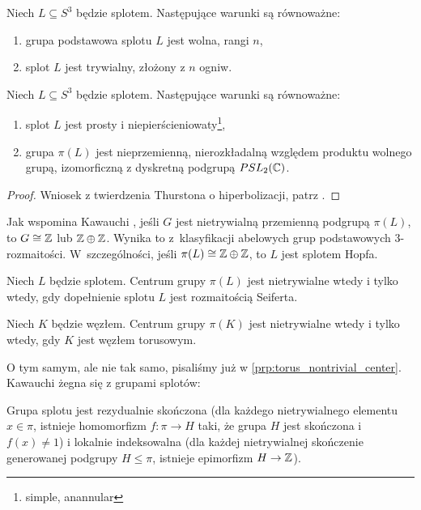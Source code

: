 \begin{corollary}
    Niech $L \subseteq S^3$ będzie splotem.
    Następujące warunki są równoważne:
    \begin{enumerate}
        \item grupa podstawowa splotu $L$ jest wolna, rangi $n$,
        \item splot $L$ jest trywialny, złożony z $n$ ogniw.
    \end{enumerate}
\end{corollary}

\begin{proposition}
    Niech $L \subseteq S^3$ będzie splotem.
    Następujące warunki są równoważne:
    \begin{enumerate}
        \item splot $L$ jest prosty i niepierścieniowaty\footnote{simple, anannular},
        \item grupa $\pi(L)$ jest nieprzemienną, nierozkładalną względem produktu wolnego grupą, izomorficzną z dyskretną podgrupą $PSL_2(\mathbb C)$.
    \end{enumerate}
\end{proposition}

\begin{proof}
    Wniosek z twierdzenia Thurstona o hiperbolizacji, patrz \cite[s. 76]{kawauchi96}.
\end{proof}

Jak wspomina Kawauchi \cite[s. 83]{kawauchi96}, jeśli $G$ jest nietrywialną przemienną podgrupą $\pi(L)$, to $G \cong \mathbb Z$ lub $\mathbb Z \oplus \mathbb Z$.
Wynika to z~klasyfikacji abelowych grup podstawowych 3-rozmaitości.
W~szczególności, jeśli $\pi(L) \cong \mathbb Z \oplus \mathbb Z$, to $L$ jest splotem Hopfa.

\begin{proposition}
    Niech $L$ będzie splotem.
    Centrum grupy $\pi(L)$ jest nietrywialne wtedy i tylko wtedy, gdy dopełnienie splotu $L$ jest rozmaitością Seiferta.
\end{proposition}

\begin{corollary}
    Niech $K$ będzie węzłem.
    Centrum grupy $\pi(K)$ jest nietrywialne wtedy i tylko wtedy, gdy $K$ jest węzłem torusowym.
\end{corollary}

O tym samym, ale nie tak samo, pisaliśmy już w \ref{prp:torus_nontrivial_center}.
Kawauchi \cite[s. 85]{kawauchi96} żegna się z grupami splotów:

\begin{proposition}
    Grupa splotu jest rezydualnie skończona (dla każdego nietrywialnego elementu $x \in \pi$, istnieje homomorfizm $f: \pi \to H$ taki, że grupa $H$ jest skończona i $f(x) \neq 1$) i lokalnie indeksowalna (dla każdej  nietrywialnej skończenie generowanej podgrupy $H \le \pi$, istnieje epimorfizm $H \to \mathbb Z$).
\end{proposition}





